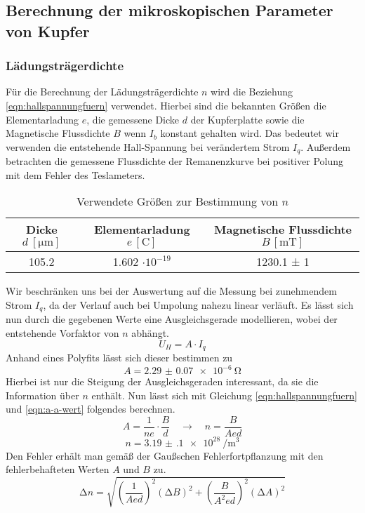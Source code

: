 \subsection{Berechnung der mikroskopischen Parameter von Kupfer}
\subsubsection{Lädungsträgerdichte}
Für die Berechnung der Lädungsträgerdichte $n$ wird die Beziehung \eqref{eqn:hallspannungfuern} verwendet. Hierbei sind die 
bekannten Größen die Elementarladung $e$, die gemessene Dicke $d$ der Kupferplatte sowie die Magnetische Flussdichte $B$ wenn $I_{b}$ konstant gehalten wird.
Das bedeutet wir verwenden die entstehende Hall-Spannung bei verändertem Strom $I_{q}$.
Außerdem betrachten die gemessene Flussdichte der Remanenzkurve bei positiver Polung mit dem Fehler des Teslameters.
\begin{table}
  \centering
  \caption{Verwendete Größen zur Bestimmung von $n$}
  \label{tab:nbestimmung}
  \begin{tabular}{c c c}
    Dicke {$d \: [\si{\micro\meter}]$} & Elementarladung $e \, [\si{\coulomb}]$ & Magnetische Flussdichte $B \, [\si{\milli\tesla}]$ \\
    \midrule
    105.2   & 1.602 $\cdot 10^{-19}$ & 1230.1 ± 1 \\
    \bottomrule
  \end{tabular}
\end{table}
Wir beschränken uns bei der Auswertung auf die Messung bei zunehmendem Strom ${I_{q}}$, da der Verlauf auch bei Umpolung nahezu linear verläuft.
Es lässt sich nun durch die gegebenen Werte eine Ausgleichsgerade modellieren, wobei der entstehende Vorfaktor von $n$ abhängt.
\begin{equation}
U_{H} = A \cdot I_{q}
\end{equation}
Anhand eines Polyfits lässt sich dieser bestimmen zu
\begin{equation}
\label{eqn:a-a-wert}
A = \SI{2.29(7)e-6}{\ohm}
\end{equation}
Hierbei ist nur die Steigung der Ausgleichsgeraden interessant, da sie die Information über $n$ enthält.
Nun lässt sich mit Gleichung \eqref{eqn:hallspannungfuern} und \eqref{eqn:a-a-wert} folgendes berechnen.
\begin{equation}
A = \frac{1}{n e} \cdot \frac{B}{d} \quad \to \quad n = \frac{B}{Aed}
\end{equation}
\begin{equation}
\label{eqn:nwert}
n = \SI{3.19(10)e28}{\per\meter\cubed}
\end{equation}
Den Fehler erhält man gemäß der Gaußschen Fehlerfortpflanzung mit den fehlerbehafteten Werten $A$ und $B$ zu.
\begin{equation}
\increment n = \sqrt{\left( \frac{1}{A e d}\right)^{2} (\increment B)^{2} + \left( \frac{B}{A^{2} e d}\right)^{2} (\increment A)^{2}}
\end{equation}
